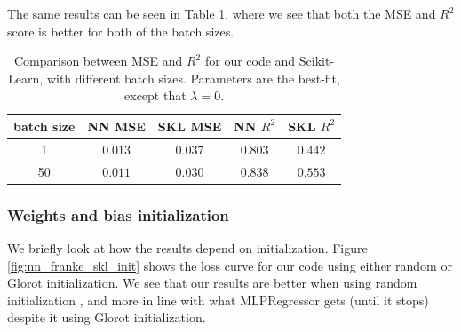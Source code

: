 \documentclass[a4paper]{article}
\begin{document}
The same results can be seen in Table \ref{tab:nn_franke_skl}, where we see that both the MSE and $R^2$ score is better for both of the batch sizes.
\begin{table}[H]
  \centering
  \caption{Comparison between MSE and $R^2$ for our code and Scikit-Learn, with different batch sizes. Parameters are the best-fit, except that $\lambda = 0$.}
  \label{tab:nn_franke_skl}
  \begin{tabular}{c|c|c|c|c}
    \hline\hline
    batch size & NN MSE & SKL MSE & NN $R^2$ & SKL $R^2$\\\hline
	1 & $0.013$ & $0.037$ & $0.803$ & $0.442$\\
	50& $0.011$ & $0.030$ & $0.838$ & $0.553$
    \end{tabular}
\end{table}
\subsubsection*{Weights and bias initialization}
We briefly look at how the results depend on initialization. Figure \ref{fig:nn_franke_skl_init} shows the loss curve for our code using either random or Glorot initialization. We see that our results are better when using random initialization , and more in line with what MLPRegressor gets (until it stops) despite it using Glorot initialization.
\end{document}
